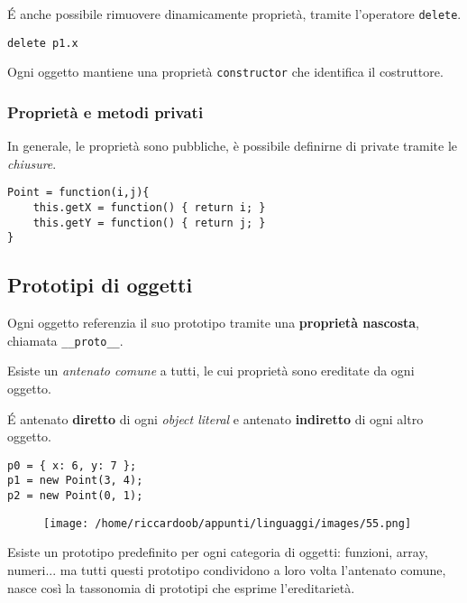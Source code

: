 É anche possibile rimuovere dinamicamente proprietà, tramite l'operatore \texttt{delete}.
\begin{verbatim}
delete p1.x
\end{verbatim}

Ogni oggetto mantiene una proprietà \texttt{constructor} che identifica il costruttore.

\subsubsection{Proprietà e metodi privati}
In generale, le proprietà sono pubbliche, è possibile definirne di private tramite le \textit{chiusure}.

\begin{verbatim}
Point = function(i,j){
    this.getX = function() { return i; }
    this.getY = function() { return j; }
}
\end{verbatim}

\subsection{Prototipi di oggetti}
Ogni oggetto referenzia il suo prototipo tramite una \textbf{proprietà nascosta}, chiamata \texttt{\_\_proto\_\_}.

Esiste un \textit{antenato comune} a tutti, le cui proprietà sono ereditate da ogni oggetto.

É antenato \textbf{diretto} di ogni \textit{object literal} e antenato \textbf{indiretto} di ogni altro oggetto.

\begin{verbatim}
p0 = { x: 6, y: 7 };
p1 = new Point(3, 4);
p2 = new Point(0, 1);
\end{verbatim}

\begin{figure}[H]
    \centering
    \texttt{[image: /home/riccardoob/appunti/linguaggi/images/55.png]}
\end{figure}

Esiste un prototipo predefinito per ogni categoria di oggetti: funzioni, array, numeri... ma tutti questi prototipo condividono a loro volta l'antenato comune, nasce così la tassonomia di prototipi che esprime l'ereditarietà.

